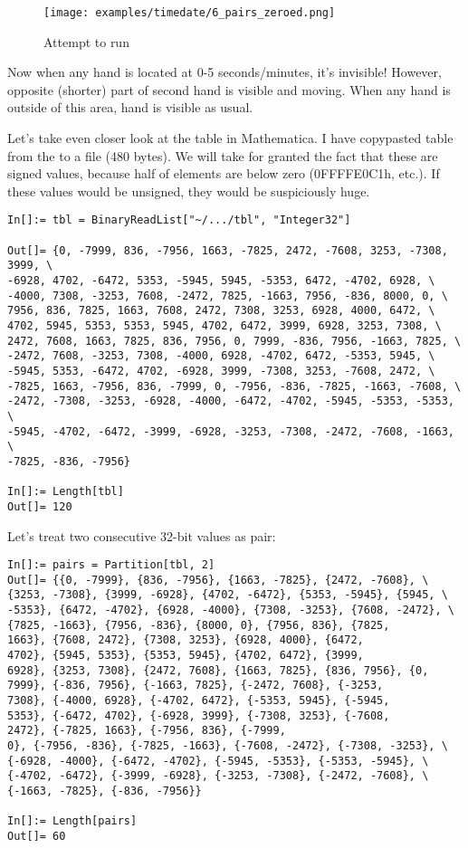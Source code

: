 \begin{figure}[H]
\centering
\texttt{[image: examples/timedate/6\_pairs\_zeroed.png]}
\caption{Attempt to run}
\end{figure}

Now when any hand is located at 0-5 seconds/minutes, it's invisible! However, opposite (shorter) part of second hand
is visible and moving.
When any hand is outside of this area, hand is visible as usual.

Let's take even closer look at the table in Mathematica.
I have copypasted table from the  to a  file (480 bytes).
We will take for granted the fact that these are signed values, because half of elements are below zero (0FFFFE0C1h, etc.).
If these values would be unsigned, they would be suspiciously huge.

\begin{lstlisting}[style=custommath]
In[]:= tbl = BinaryReadList["~/.../tbl", "Integer32"]

Out[]= {0, -7999, 836, -7956, 1663, -7825, 2472, -7608, 3253, -7308, 3999, \
-6928, 4702, -6472, 5353, -5945, 5945, -5353, 6472, -4702, 6928, \
-4000, 7308, -3253, 7608, -2472, 7825, -1663, 7956, -836, 8000, 0, \
7956, 836, 7825, 1663, 7608, 2472, 7308, 3253, 6928, 4000, 6472, \
4702, 5945, 5353, 5353, 5945, 4702, 6472, 3999, 6928, 3253, 7308, \
2472, 7608, 1663, 7825, 836, 7956, 0, 7999, -836, 7956, -1663, 7825, \
-2472, 7608, -3253, 7308, -4000, 6928, -4702, 6472, -5353, 5945, \
-5945, 5353, -6472, 4702, -6928, 3999, -7308, 3253, -7608, 2472, \
-7825, 1663, -7956, 836, -7999, 0, -7956, -836, -7825, -1663, -7608, \
-2472, -7308, -3253, -6928, -4000, -6472, -4702, -5945, -5353, -5353, \
-5945, -4702, -6472, -3999, -6928, -3253, -7308, -2472, -7608, -1663, \
-7825, -836, -7956}

In[]:= Length[tbl]
Out[]= 120
\end{lstlisting}

Let's treat two consecutive 32-bit values as pair:

\begin{lstlisting}[style=custommath]
In[]:= pairs = Partition[tbl, 2]
Out[]= {{0, -7999}, {836, -7956}, {1663, -7825}, {2472, -7608}, \
{3253, -7308}, {3999, -6928}, {4702, -6472}, {5353, -5945}, {5945, \
-5353}, {6472, -4702}, {6928, -4000}, {7308, -3253}, {7608, -2472}, \
{7825, -1663}, {7956, -836}, {8000, 0}, {7956, 836}, {7825, 
1663}, {7608, 2472}, {7308, 3253}, {6928, 4000}, {6472, 
4702}, {5945, 5353}, {5353, 5945}, {4702, 6472}, {3999, 
6928}, {3253, 7308}, {2472, 7608}, {1663, 7825}, {836, 7956}, {0, 
7999}, {-836, 7956}, {-1663, 7825}, {-2472, 7608}, {-3253, 
7308}, {-4000, 6928}, {-4702, 6472}, {-5353, 5945}, {-5945, 
5353}, {-6472, 4702}, {-6928, 3999}, {-7308, 3253}, {-7608, 
2472}, {-7825, 1663}, {-7956, 836}, {-7999, 
0}, {-7956, -836}, {-7825, -1663}, {-7608, -2472}, {-7308, -3253}, \
{-6928, -4000}, {-6472, -4702}, {-5945, -5353}, {-5353, -5945}, \
{-4702, -6472}, {-3999, -6928}, {-3253, -7308}, {-2472, -7608}, \
{-1663, -7825}, {-836, -7956}}

In[]:= Length[pairs]
Out[]= 60
\end{lstlisting}

